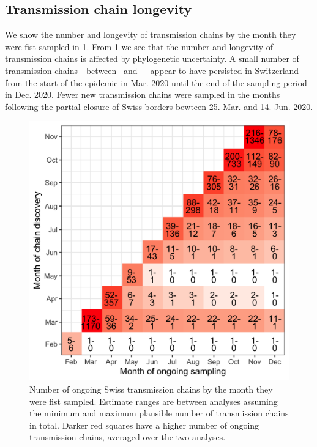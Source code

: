 \documentclass[9pt,twocolumn,twoside,lineno]{pnas-new}
\begin{document}
\subsection{Transmission chain longevity}
We show the number and longevity of transmission chains by the month they were fist sampled in \ref{fig:chain-longevity}. From \ref{fig:chain-longevity} we see that the number and longevity of transmission chains is affected by phylogenetic uncertainty. A small number of transmission chains - between \nspanningchainsmax\ and \nspanningchainsmin\ - appear to have persisted in Switzerland from the start of the epidemic in Mar. 2020 until the end of the sampling period in Dec. 2020. Fewer new transmission chains were sampled in the months following the partial closure of Swiss borders bewteen 25. Mar. and 14. Jun. 2020. 
\begin{figure}[tbhp]
\centering
\includegraphics[width=.8\linewidth]{figures/chain_longevity_matrix.png}
\caption{Number of ongoing Swiss transmission chains by the month they were fist sampled. Estimate ranges are between analyses assuming the minimum and maximum plausible number of transmission chains in total. Darker red squares have a higher number of ongoing transmission chains, averaged over the two analyses.}
\label{fig:chain-longevity}
\end{figure}

\end{document}
